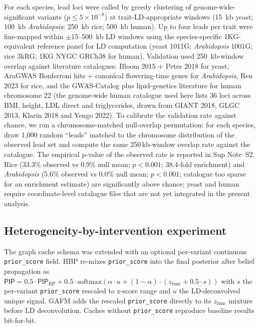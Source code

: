For each species, lead loci were called by greedy clustering of
genome-wide-significant variants ($p \leq 5\times10^{-8}$) at
trait-LD-appropriate windows (15~kb yeast; 100~kb \emph{Arabidopsis};
250~kb rice; 500~kb human). Up to four leads per trait were
fine-mapped within $\pm$15--500~kb LD windows using the
species-specific 1KG-equivalent reference panel for LD computation
(yeast 1011G; \emph{Arabidopsis} 1001G; rice 3kRG;
1KG NYGC GRCh38 for human). Validation used 250~kb-window overlap
against literature catalogues: Bloom 2015\cite{bloom2015genetic} +
Peter 2018\cite{peter2018genome} for yeast,
AraGWAS\cite{togninalli2018aragwas} Bonferroni hits + canonical
flowering-time genes for \emph{Arabidopsis},
Ren 2023\cite{ren2023rice} for rice, and the
GWAS-Catalog\cite{buniello2019nhgri} plus
lipid-genetics literature for human chromosome 22 (the genome-wide
human catalogue used here lists 36 loci across BMI, height, LDL
direct and triglycerides, drawn from GIANT 2018, GLGC 2013, Klarin
2018 and Yengo 2022). To calibrate the validation rate against
chance, we ran a chromosome-matched null-overlap permutation: for
each species, draw 1{,}000 random ``leads'' matched to the
chromosome distribution of the observed lead set and compute the
same 250\,kb-window overlap rate against the catalogue. The
empirical p-value of the observed rate is reported in Sup Note~S2.
Rice (33.3\% observed vs 0.9\% null mean; $p<0.001$; 38.4-fold
enrichment) and \emph{Arabidopsis} (5.6\% observed vs 0.0\% null
mean; $p<0.001$; catalogue too sparse for an enrichment estimate)
are significantly above chance; yeast and human require
coordinate-level catalogue files that are not yet integrated in
the present analysis.

\subsection*{Heterogeneity-by-intervention experiment}\label{methods:intervention}

The graph cache schema was extended with an optional per-variant
continuous \texttt{prior\_score} field. HBP re-mixes
\texttt{prior\_score} into the final posterior after belief
propagation as $\textsf{PIP} = 0.5 \cdot \textsf{PIP}_{\text{BP}} +
0.5 \cdot \mathrm{softmax}(\alpha \cdot u + (1-\alpha) \cdot
(z_{\text{func}} + 0.5 \cdot s))$ with $s$ the per-variant
\texttt{prior\_score} rescaled to z-score range and $u$ the
LD-deconvolved unique signal. GAFM adds the rescaled
\texttt{prior\_score} directly to its $z_{\text{func}}$ mixture
before LD deconvolution. Caches without
\texttt{prior\_score} reproduce baseline results bit-for-bit.

